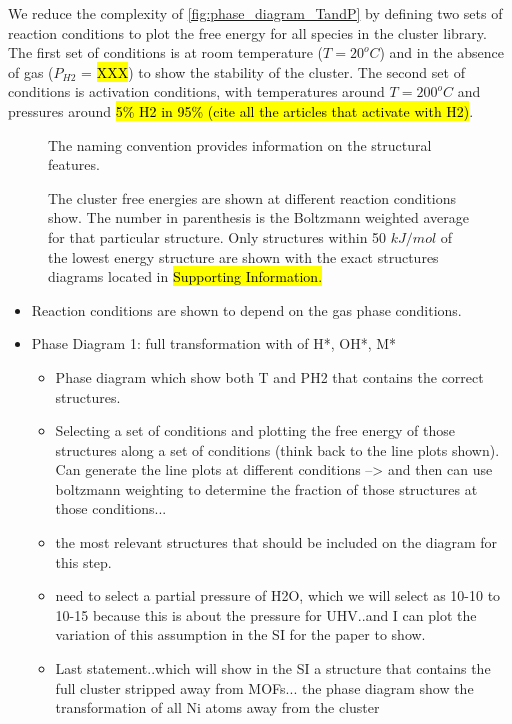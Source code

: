 \documentclass[journal=jctcce,manuscript=article]{achemso}
\begin{document}
We reduce the complexity of \ref{fig:phase_diagram_TandP} by defining two sets of reaction conditions to plot the free energy for all species in the  cluster library. The first set of conditions is at room temperature ($T = 20 ^{o}C$) and in the absence of  gas ($P_{H2}$ = \hl{XXX}) to show the stability of the cluster. The second set of conditions is activation conditions, with temperatures around $T = 200 ^{o}C$ and pressures around \hl{5\% H2 in 95\% (cite all the articles that activate with H2)}.      

\begin{figure}
    \centering
    \caption{The  cluster free energies are shown at different reaction conditions show. The number in parenthesis is the Boltzmann weighted average for that particular structure. Only structures within 50 $kJ/mol$ of the lowest energy structure are shown with the exact structures diagrams located in \hl{Supporting Information.}} The naming convention provides information on the structural features. 
    \label{fig:diff-reaction-conditons}
\end{figure}


\begin{itemize}
    \item Reaction conditions are shown to depend on the gas phase conditions. 
    \item Phase Diagram 1: full transformation with of H*, OH*, M* 
    \begin{itemize}
        \item Phase diagram which show both T and PH2 that contains the correct structures. 
        \item Selecting a set of conditions and plotting the free energy of those structures along a set of conditions (think back to the line plots shown). Can generate the line plots at different conditions --> and then can use boltzmann weighting to determine the fraction of those structures at those conditions... 
        \item the most relevant structures that should be included on the diagram for this step. 
        \item need to select a partial pressure of H2O, which we will select as 10-10 to 10-15 because this is about the pressure for UHV..and I can plot the variation of this assumption in the SI for the paper to show. 
        \item Last statement..which will show in the SI a structure that contains the full cluster stripped away from MOFs... the phase diagram show the transformation of all Ni atoms away from the cluster
    \end{itemize}
\end{itemize}
\end{document}
